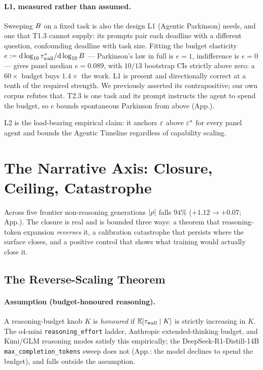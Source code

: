 \documentclass{article}
\begin{document}
\paragraph{L1, measured rather than assumed.} Sweeping $B$ on a fixed task is also the design L1 (Agentic Parkinson) needs, and one that T1.3 cannot supply: its prompts pair each deadline with a different question, confounding deadline with task size. Fitting the budget elasticity $e := \mathrm{d}\log_{10}\tau_{\mathrm{wall}}^{*}/\mathrm{d}\log_{10}B$ --- Parkinson's law in full is $e=1$, indifference is $e=0$ --- gives panel median $e = 0.089$, with $10/13$ bootstrap CIs strictly above zero: a $60\times$ budget buys $1.4\times$ the work. L1 is present and directionally correct at a tenth of the required strength. We previously asserted its contrapositive; our own corpus refutes that. T2.3 is one task and its prompt instructs the agent to spend the budget, so $e$ bounds spontaneous Parkinson from above (App.).

L2 is the load-bearing empirical claim: it anchors $\varepsilon$ above $\varepsilon^{*}$ for every panel agent and bounds the Agentic Timeline regardless of capability scaling.

\section{The Narrative Axis: Closure, Ceiling, Catastrophe}\label{sec:l3}

Across five frontier non-reasoning generations $|\rho|$ falls $94\%$ ($+1.12 \to +0.07$; App.). The closure is real and is bounded three ways: a theorem that reasoning-token expansion \emph{reverses} it, a calibration catastrophe that persists where the surface closes, and a positive control that shows what training would actually close it.

\subsection{The Reverse-Scaling Theorem}\label{ssec:rs}

\paragraph{Assumption (budget-honoured reasoning).}\label{ass:bh} A reasoning-budget knob $K$ is \emph{honoured} if $\mathbb{E}[\tau_{\mathrm{wall}} \mid K]$ is strictly increasing in $K$. The o4-mini \texttt{reasoning\_effort} ladder, Anthropic extended-thinking budget, and Kimi/GLM reasoning modes satisfy this empirically; the DeepSeek-R1-Distill-14B \texttt{max\_completion\_tokens} sweep does not (App.: the model declines to spend the budget), and falls outside the assumption.
\end{document}
